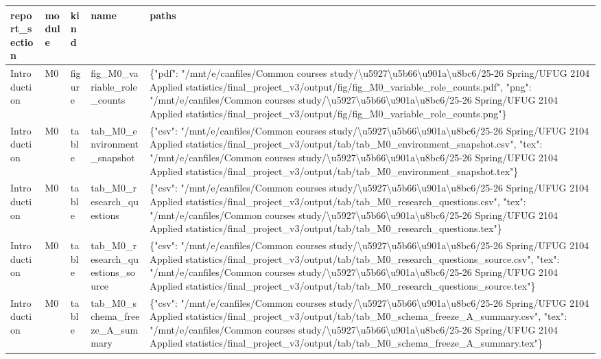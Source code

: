 \begin{tabular}{lllll}
\toprule
report\_section & module & kind & name & paths \\
\midrule
Introduction & M0 & figure & fig\_M0\_variable\_role\_counts & \{"pdf": "/mnt/e/canfiles/Common courses study/\textbackslash u5927\textbackslash u5b66\textbackslash u901a\textbackslash u8bc6/25-26 Spring/UFUG 2104 Applied statistics/final\_project\_v3/output/fig/fig\_M0\_variable\_role\_counts.pdf", "png": "/mnt/e/canfiles/Common courses study/\textbackslash u5927\textbackslash u5b66\textbackslash u901a\textbackslash u8bc6/25-26 Spring/UFUG 2104 Applied statistics/final\_project\_v3/output/fig/fig\_M0\_variable\_role\_counts.png"\} \\
Introduction & M0 & table & tab\_M0\_environment\_snapshot & \{"csv": "/mnt/e/canfiles/Common courses study/\textbackslash u5927\textbackslash u5b66\textbackslash u901a\textbackslash u8bc6/25-26 Spring/UFUG 2104 Applied statistics/final\_project\_v3/output/tab/tab\_M0\_environment\_snapshot.csv", "tex": "/mnt/e/canfiles/Common courses study/\textbackslash u5927\textbackslash u5b66\textbackslash u901a\textbackslash u8bc6/25-26 Spring/UFUG 2104 Applied statistics/final\_project\_v3/output/tab/tab\_M0\_environment\_snapshot.tex"\} \\
Introduction & M0 & table & tab\_M0\_research\_questions & \{"csv": "/mnt/e/canfiles/Common courses study/\textbackslash u5927\textbackslash u5b66\textbackslash u901a\textbackslash u8bc6/25-26 Spring/UFUG 2104 Applied statistics/final\_project\_v3/output/tab/tab\_M0\_research\_questions.csv", "tex": "/mnt/e/canfiles/Common courses study/\textbackslash u5927\textbackslash u5b66\textbackslash u901a\textbackslash u8bc6/25-26 Spring/UFUG 2104 Applied statistics/final\_project\_v3/output/tab/tab\_M0\_research\_questions.tex"\} \\
Introduction & M0 & table & tab\_M0\_research\_questions\_source & \{"csv": "/mnt/e/canfiles/Common courses study/\textbackslash u5927\textbackslash u5b66\textbackslash u901a\textbackslash u8bc6/25-26 Spring/UFUG 2104 Applied statistics/final\_project\_v3/output/tab/tab\_M0\_research\_questions\_source.csv", "tex": "/mnt/e/canfiles/Common courses study/\textbackslash u5927\textbackslash u5b66\textbackslash u901a\textbackslash u8bc6/25-26 Spring/UFUG 2104 Applied statistics/final\_project\_v3/output/tab/tab\_M0\_research\_questions\_source.tex"\} \\
Introduction & M0 & table & tab\_M0\_schema\_freeze\_A\_summary & \{"csv": "/mnt/e/canfiles/Common courses study/\textbackslash u5927\textbackslash u5b66\textbackslash u901a\textbackslash u8bc6/25-26 Spring/UFUG 2104 Applied statistics/final\_project\_v3/output/tab/tab\_M0\_schema\_freeze\_A\_summary.csv", "tex": "/mnt/e/canfiles/Common courses study/\textbackslash u5927\textbackslash u5b66\textbackslash u901a\textbackslash u8bc6/25-26 Spring/UFUG 2104 Applied statistics/final\_project\_v3/output/tab/tab\_M0\_schema\_freeze\_A\_summary.tex"\} \\

\end{tabular}
